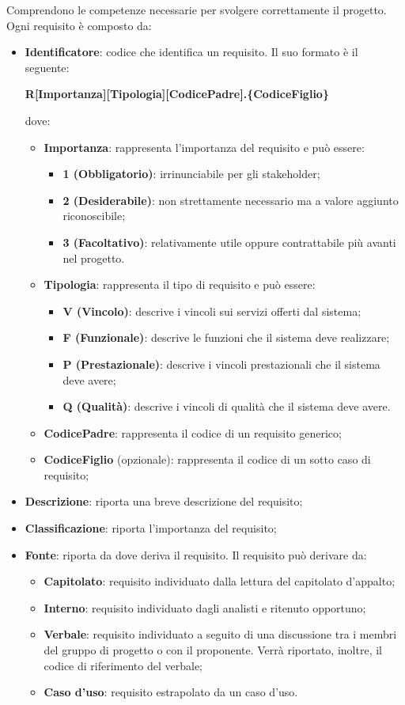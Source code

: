 Comprendono le competenze necessarie per svolgere correttamente il progetto.\\
Ogni requisito è composto da:
\begin{itemize}
\item \textbf{Identificatore}: codice che identifica un requisito. Il suo formato è il seguente:
\begin{center}
\textbf{R[Importanza][Tipologia][CodicePadre].\{CodiceFiglio\}}\\
\end{center}
dove:
\begin{itemize}
\item \textbf{Importanza}: rappresenta l'importanza del requisito e può essere:
\begin{itemize}
\item \textbf{1 (Obbligatorio)}: irrinunciabile per gli stakeholder;
\item \textbf{2 (Desiderabile)}: non strettamente necessario ma a valore aggiunto riconoscibile;
\item \textbf{3 (Facoltativo)}: relativamente utile oppure contrattabile più avanti nel progetto.
\end{itemize}
\item \textbf{Tipologia}: rappresenta il tipo di requisito e può essere:
\begin{itemize}
\item \textbf{V (Vincolo)}: descrive i vincoli sui servizi offerti dal sistema;
\item \textbf{F (Funzionale)}: descrive le funzioni che il sistema deve realizzare;
\item \textbf{P (Prestazionale)}: descrive i vincoli prestazionali che il sistema deve avere;
\item \textbf{Q (Qualità)}: descrive i vincoli di qualità che il sistema deve avere.
\end{itemize}
\item \textbf{CodicePadre}: rappresenta il codice di un requisito generico;
\item \textbf{CodiceFiglio} (opzionale): rappresenta il codice di un sotto caso di requisito;
\end{itemize}
\item \textbf{Descrizione}: riporta una breve descrizione del requisito;
\item \textbf{Classificazione}: riporta l'importanza del requisito;
\item \textbf{Fonte}: riporta da dove deriva il requisito. Il requisito può derivare da:
\begin{itemize}
\item \textbf{Capitolato}: requisito individuato dalla lettura del capitolato d'appalto;
\item \textbf{Interno}: requisito individuato dagli analisti e ritenuto opportuno;
\item \textbf{Verbale}: requisito individuato a seguito di una discussione tra i membri del gruppo di progetto o con il proponente. Verrà riportato, inoltre, il codice di riferimento del verbale;
\item \textbf{Caso d'uso}: requisito estrapolato da un caso d'uso.
\end{itemize}
\end{itemize}
